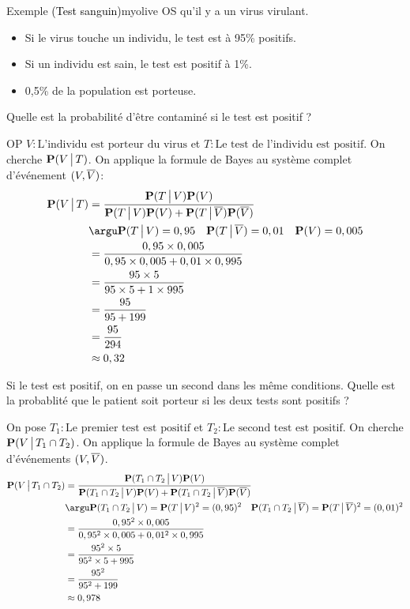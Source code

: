     \begin{omed}{Exemple \textcolor{black}{(Test sanguin)}}{myolive}
        OS qu’il y a un virus virulant. \begin{itemize}
            \item Si le virus touche un individu, le test est à 95\% positifs.
            \item Si un individu est sain, le test est positif à 1\%. 
            \item 0,5\% de la population est porteuse.
        \end{itemize}
        Quelle est la probabilité d’être contaminé si le test est positif ? 

        OP $V : \text{L’individu est porteur du virus}$ et $T : \text{Le test de l’individu est positif}$. On cherche $\mathbf{P}(V \, \big| \, T)$. On applique la formule de Bayes au système complet d’événement $(V, \overline{V})$:
        \begin{align*}
            \mathbf{P}(V \tq T) 
            &= \frac{\mathbf{P}(T \tq V) \mathbf{P}(V)}{\mathbf{P}(T \tq V) \mathbf{P}(V) + \mathbf{P}(T \tq \barr{V}) \mathbf{P}(\barr{V})} \\
            &\argu \mathbf{P}(T \tq V) = 0,95 \quad \mathbf{P}(T \tq \barr{V}) = 0,01 \quad \mathbf{P}(V) = 0,005 \\
            &= \frac{0,95 \times 0,005}{0,95 \times 0,005 + 0,01 \times 0,995} \\
            &= \frac{95 \times 5}{95 \times 5 + 1 \times 995} \\
            &= \frac{95}{95 + 199}  \\
            &= \frac{95}{294}  \\
            &\approx 0,32
        \end{align*}
        
        Si le test est positif, on en passe un second dans les même conditions. Quelle est la probablité que le patient soit porteur si les deux tests sont positifs ? 

        On pose $T_1 : \text{Le premier test est positif}$ et $T_2 : \text{Le second test est positif}$. On cherche $\mathbf{P}(V \, \big| \, T_1 \cap T_2)$. On applique la formule de Bayes au système complet d’événements $(V, \overline{V})$.
        \begin{align*}
            \mathbf{P}(V \tq T_1 \cap T_2) 
            &= \frac{\mathbf{P}(T_1 \cap T_2 \tq V) \mathbf{P}(V)}{\mathbf{P}(T_1 \cap T_2 \tq V) \mathbf{P}(V) + \mathbf{P}(T_1 \cap T_2 \tq \barr{V}) \mathbf{P}(\barr{V})} \\
            &\argu \mathbf{P}(T_1 \cap T_2 \tq V) = \mathbf{P}(T \tq V)^2 = (0,95)^2 \quad \mathbf{P}(T_1 \cap T_2 \tq \barr{V}) = \mathbf{P}(T \tq \barr{V})^2 = (0,01)^2 \\
            &= \frac{0,95^2 \times 0,005}{0,95^2 \times 0,005 + 0,01^2 \times 0,995} \\
            &= \frac{95^2 \times 5}{95^2 \times 5 + 995} \\
            &= \frac{95^2}{95^2 + 199} \\
            &\approx 0,978
        \end{align*}
    \end{omed}

